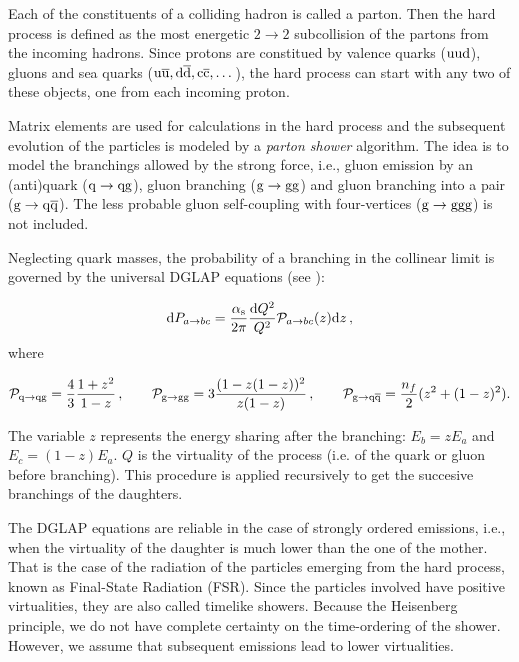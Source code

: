 \documentclass[a4paper,12pt]{article}
\begin{document}
Each of the constituents of a colliding hadron is called a parton. Then the hard process is defined as the most energetic $2\rightarrow 2$  subcollision of the partons from the incoming hadrons. Since protons are constitued by valence quarks (${\mathrm u}{\mathrm u}{\mathrm d}$), gluons and sea quarks (${\mathrm u}\overline{\mathrm u}, {\mathrm d}\overline{\mathrm d}, {\mathrm c}\overline{\mathrm c}, \dots$), the hard process can start with any two of these objects, one from each incoming proton.

Matrix elements are used for calculations in the hard process and the subsequent evolution of the particles is modeled by a \textit{parton shower} algorithm. The idea is to model the branchings allowed by the strong force, i.e., gluon emission by an (anti)quark (${\mathrm q}\to {\mathrm q} {\mathrm g}$), gluon branching (${\mathrm g}\to {\mathrm g} {\mathrm g}$) and gluon branching into a pair (${\mathrm g}\to {\mathrm q} \overline{\mathrm q}$). The less probable gluon self-coupling with four-vertices (${\mathrm g}\to {\mathrm g}{\mathrm g}{\mathrm g}$) is not included.

Neglecting quark masses, the probability of a branching in the collinear limit is governed by the universal DGLAP equations (see \cite{Sjostrand:2009ad}):

\begin{equation}
  {\mathrm d} P_{a\to bc} = \frac{\alpha_{\mathrm{s}}}{2\pi}\frac{{\mathrm d} Q^2}{Q^2}\mathcal{P}_{a\rightarrow bc}(z) {\mathrm d} z\label{eq:DGLAP}
  \, ,
\end{equation}
where

$$
\mathcal{P}_{{\mathrm q}\to {\mathrm q}{\mathrm g}} = \frac43 \frac{1+z^2}{1-z}
  \, , \hspace{2em}
\mathcal{P}_{{\mathrm g}\to {\mathrm g}{\mathrm g}} = 3 \frac{(1-z(1-z))^2}{z(1-z)}
  \, , \hspace{2em}
\mathcal{P}_{{\mathrm g}\to {\mathrm q}\overline{\mathrm q}} = \frac{n_f}2 (z^2+(1-z)^2).
$$

The variable $z$ represents the energy sharing after the branching: $E_b=zE_a$ and $E_c=(1-z)E_a$. $Q$ is the virtuality of the process (i.e. of the quark or gluon before branching). This procedure is applied recursively to get the succesive branchings of the daughters.

The DGLAP equations are reliable in the case of strongly ordered emissions, i.e., when the virtuality of the daughter is much lower than the one of the mother. That is the case of the radiation of the particles emerging from the hard process, known as Final-State Radiation (FSR). Since the particles involved have positive virtualities, they are also called timelike showers. Because the Heisenberg principle, we do not have complete certainty on the time-ordering of the shower. However, we assume that subsequent emissions lead to lower virtualities.
\end{document}
